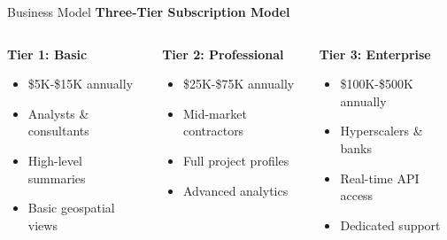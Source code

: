 \documentclass[aspectratio=169]{beamer}
\begin{document}
\begin{frame}{Business Model}
    \textbf{Three-Tier Subscription Model}
    
    \vspace{0.5cm}
    \begin{columns}
        \begin{column}{0.33\textwidth}
            \textbf{Tier 1: Basic}
            \begin{itemize}
                \item \$5K-\$15K annually
                \item Analysts \& consultants
                \item High-level summaries
                \item Basic geospatial views
            \end{itemize}
        \end{column}
        \begin{column}{0.33\textwidth}
            \textbf{Tier 2: Professional}
            \begin{itemize}
                \item \$25K-\$75K annually
                \item Mid-market contractors
                \item Full project profiles
                \item Advanced analytics
            \end{itemize}
        \end{column}
        \begin{column}{0.33\textwidth}
            \textbf{Tier 3: Enterprise}
            \begin{itemize}
                \item \$100K-\$500K annually
                \item Hyperscalers \& banks
                \item Real-time API access
                \item Dedicated support
            \end{itemize}
        \end{column}
    \end{columns}
\end{frame}
\end{document}
